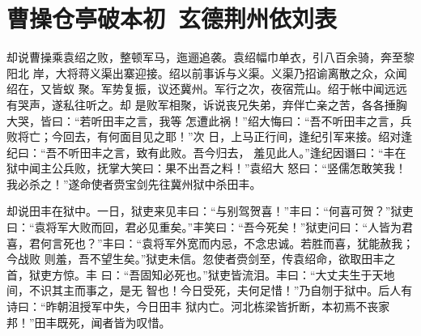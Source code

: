 \chapter{曹操仓亭破本初~玄德荆州依刘表}

却说曹操乘袁绍之败，整顿军马，迤逦追袭。袁绍幅巾单衣，引八百余骑，奔至黎阳北
岸，大将蒋义渠出寨迎接。绍以前事诉与义渠。义渠乃招谕离散之众，众闻绍在，又皆蚁
聚。军势复振，议还冀州。军行之次，夜宿荒山。绍于帐中闻远远有哭声，遂私往听之。却
是败军相聚，诉说丧兄失弟，弃伴亡亲之苦，各各捶胸大哭，皆曰：“若听田丰之言，我等
怎遭此祸！”绍大悔曰：“吾不听田丰之言，兵败将亡；今回去，有何面目见之耶！”次
日，上马正行间，逢纪引军来接。绍对逢纪曰：“吾不听田丰之言，致有此败。吾今归去，
羞见此人。”逢纪因谮曰：“丰在狱中闻主公兵败，抚掌大笑曰：果不出吾之料！”袁绍大
怒曰：“竖儒怎敢笑我！我必杀之！”遂命使者赍宝剑先往冀州狱中杀田丰。

却说田丰在狱中。一日，狱吏来见丰曰：“与别驾贺喜！”丰曰：“何喜可贺？”狱吏
曰：“袁将军大败而回，君必见重矣。”丰笑曰：“吾今死矣！”狱吏问曰：“人皆为君
喜，君何言死也？”丰曰：“袁将军外宽而内忌，不念忠诚。若胜而喜，犹能赦我；今战败
则羞，吾不望生矣。”狱吏未信。忽使者赍剑至，传袁绍命，欲取田丰之首，狱吏方惊。丰
曰：“吾固知必死也。”狱吏皆流泪。丰曰：“大丈夫生于天地间，不识其主而事之，是无
智也！今日受死，夫何足惜！”乃自刎于狱中。后人有诗曰：“昨朝沮授军中失，今日田丰
狱内亡。河北栋梁皆折断，本初焉不丧家邦！”田丰既死，闻者皆为叹惜。

